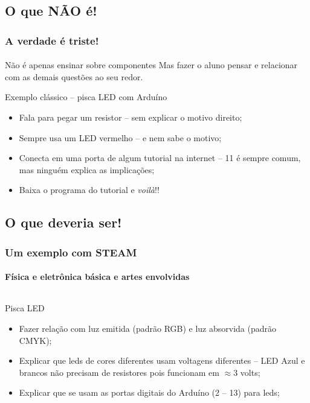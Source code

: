 \documentclass{beamer}
\begin{document}
\subsection{O que NÃO é!}
\begin{frame}
\frametitle{A verdade é triste!}
\framesubtitle{}
	\begin{block}{Não é apenas ensinar sobre componentes}
	Mas fazer o aluno pensar e relacionar com as demais questões ao seu redor.
	\end{block}
	
	\begin{block}{Exemplo clássico -- pisca LED com Arduíno}
		\begin{itemize}
			\item Fala para pegar um resistor -- sem explicar o motivo direito;
			\item Sempre usa um LED vermelho -- e nem sabe o motivo;
			\item Conecta em uma porta de algum tutorial na internet -- 11 é sempre comum, mas ninguém explica as implicações;
			\item Baixa o programa do tutorial e \emph{voilà}!!
		\end{itemize}
	\end{block}
	
\end{frame}

\subsection{O que deveria ser!}

\begin{frame}
\frametitle{Um exemplo com STEAM}
\framesubtitle{Física e eletrônica básica e artes envolvidas}
	\begin{columns}
	  	\begin{block}{Pisca LED}
		\begin{itemize}
			\item Fazer relação com luz emitida (padrão RGB) e luz absorvida (padrão CMYK);
			\item Explicar que leds de cores diferentes usam voltagens diferentes -- LED Azul e brancos não precisam de resistores pois funcionam em $\approx 3$ volts;
			\item Explicar que se usam as portas digitais do Arduíno (2 -- 13) para leds;
		\end{itemize}
		\end{block}
	\end{columns}
\end{frame}
\end{document}
